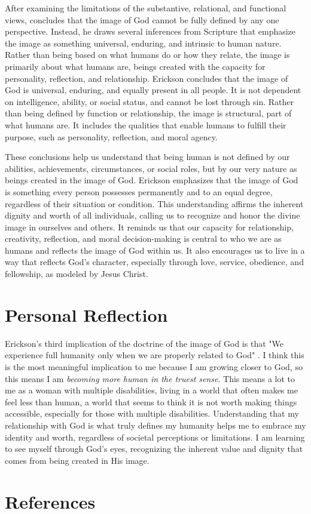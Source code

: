 \documentclass[stu,12pt,floatsintext]{apa7}
\begin{document}
After examining the limitations of the substantive, relational, and functional views, \textcite{ericksonIntroducingChristianDoctrine2015} concludes that the image of God cannot be fully defined by any one perspective. Instead, he draws several inferences from Scripture that emphasize the image as something universal, enduring, and intrinsic to human nature. Rather than being based on what humans do or how they relate, the image is primarily about what humans are, beings created with the capacity for personality, reflection, and relationship. Erickson concludes that the image of God is universal, enduring, and equally present in all people. It is not dependent on intelligence, ability, or social status, and cannot be lost through sin. Rather than being defined by function or relationship, the image is structural, part of what humans are. It includes the qualities that enable humans to fulfill their purpose, such as personality, reflection, and moral agency.

These conclusions help us understand that being human is not defined by our abilities, achievements, circumstances, or social roles, but by our very nature as beings created in the image of God. Erickson emphasizes that the image of God is something every person possesses permanently and to an equal degree, regardless of their situation or condition. This understanding affirms the inherent dignity and worth of all individuals, calling us to recognize and honor the divine image in ourselves and others. It reminds us that our capacity for relationship, creativity, reflection, and moral decision-making is central to who we are as humans and reflects the image of God within us. It also encourages us to live in a way that reflects God's character, especially through love, service, obedience, and fellowship, as modeled by Jesus Christ.

\section{Personal Reflection}

Erickson's third implication of the doctrine of the image of God is that "We experience full humanity only when we are properly related to God" \parencite{ericksonIntroducingChristianDoctrine2015}. I think this is the most meaningful implication to me because I am growing closer to God, so this means I am \textit{becoming more human in the truest sense}. This means a lot to me as a woman with multiple disabilities, living in a world that often makes me feel less than human, a world that seems to think it is not worth making things accessible, especially for those with multiple disabilities. Understanding that my relationship with God is what truly defines my humanity helps me to embrace my identity and worth, regardless of societal perceptions or limitations. I am learning to see myself through God's eyes, recognizing the inherent value and dignity that comes from being created in His image.

\newpage

\section{References}

\printbibliography
\end{document}

